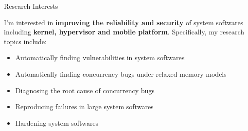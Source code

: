 \begin{rSection}{Research Interests}
\newcommand{\eg}{\textit{e}.\textit{g}.\xspace}

I'm interested in \textbf{improving the reliability and security} of
system softwares including \textbf{kernel, hypervisor and mobile
  platform}. Specifically, my research topics include:

\begin{itemize}[leftmargin=*,itemsep=-5pt]
\item{Automatically finding vulnerabilities in system softwares}
\item{Automatically finding concurrency bugs under relaxed memory models}
\item{Diagnosing the root cause of concurrency bugs}
\item{Reproducing failures in large system softwares}
\item{Hardening system softwares}
\end{itemize}

\end{rSection}
